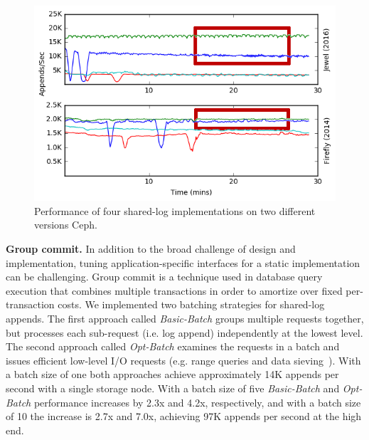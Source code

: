 \begin{figure}
    \centering
    \includegraphics[width=1.0\linewidth]{jewel_v_firefly_pd.png}
    \caption{Performance of four shared-log implementations on two different
    versions Ceph.}
    \label{fig:phy-design}
\end{figure}

{\bf Group commit.} In addition to the broad challenge of design and
implementation, tuning application-specific interfaces for a static
implementation can be challenging.  Group commit is a technique used in
database query execution that combines multiple transactions in order to
amortize over fixed per-transaction costs. We implemented two
batching strategies for shared-log appends. The first approach called
\emph{Basic-Batch} groups multiple requests together, but processes each
sub-request (i.e. log append) independently at the lowest level.
The second approach called \emph{Opt-Batch} examines the requests in a batch
and issues efficient low-level I/O requests (e.g. range queries and
data sieving~\cite{750599}). With a batch size of one both approaches achieve
approximately 14K appends per second with a single storage node. With a batch size of five
\emph{Basic-Batch} and \emph{Opt-Batch} performance increases by 2.3x and 4.2x,
respectively, and with a batch size of 10 the increase is 2.7x and 7.0x, achieving
97K appends per second at the high end.

